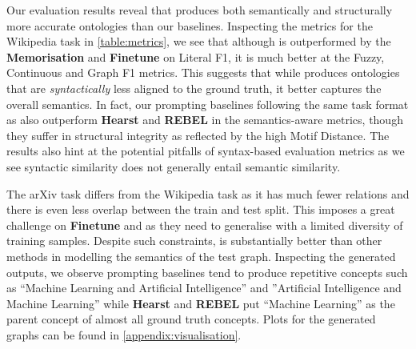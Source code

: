 Our evaluation results reveal that \name produces both semantically and structurally more accurate ontologies than our baselines. Inspecting the metrics for the Wikipedia task in \cref{table:metrics}, we see that although \name is outperformed by the \textbf{Memorisation} and \textbf{Finetune} on Literal F1, it is much better at the Fuzzy, Continuous and Graph F1 metrics. This suggests that while \name produces ontologies that are \emph{syntactically} less aligned to the ground truth, it better captures the overall semantics. In fact, our prompting baselines following the same task format as \name also outperform \textbf{Hearst} and \textbf{REBEL} in the semantics-aware metrics, though they suffer in structural integrity as reflected by the high Motif Distance. The results also hint at the potential pitfalls of syntax-based evaluation metrics as we see syntactic similarity does not generally entail semantic similarity.

The arXiv task differs from the Wikipedia task as it has much fewer relations and there is even less overlap between the train and test split. This imposes a great challenge on \textbf{Finetune} and \name as they need to generalise with a limited diversity of training samples. Despite such constraints, \name is substantially better than other methods in modelling the semantics of the test graph. Inspecting the generated outputs, we observe prompting baselines tend to produce repetitive concepts such as ``Machine Learning and Artificial Intelligence'' and ''Artificial Intelligence and Machine Learning'' while \textbf{Hearst} and \textbf{REBEL} put ``Machine Learning'' as the parent concept of almost all ground truth concepts. Plots for the generated graphs can be found in \cref{appendix:visualisation}.

